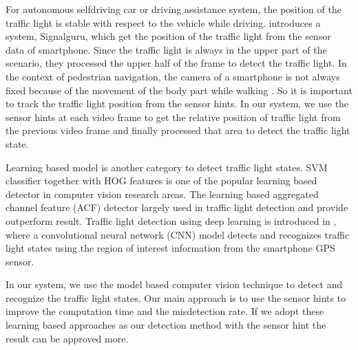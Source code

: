 For autonomous selfdriving car or driving assistance system, the position of the traffic light is stable with respect to the vehicle while driving.
\cite{signalguru} introduces a system, Signalguru, which get the position of the traffic light from the sensor data of smartphone.
Since the traffic light is always in the upper part of the scenario, they processed the upper half of the frame to detect the traffic light.
In the context of pedestrian navigation, the camera of a smartphone is not always fixed because of the movement of the body part while walking \cite{sensor_pedestrian,sensor_pedestrian2}.
So it is important to track the traffic light position from the sensor hints.
In our system, we use the sensor hints at each video frame to get the relative position of traffic light from the previous video frame and finally processed that area to detect the traffic light state.

Learning based model \cite{learning,learning2} is another category to detect traffic light states.
SVM classifier together with HOG features \cite{selfdrive} is one of the popular learning based detector in computer vision research areas.
The learning based aggregated channel feature (ACF) \cite{acf,acf2,lisa_cvpr} detector largely used in traffic light detection and provide outperform result.
Traffic light detection using deep learning is introduced in \cite{cnn,cnn2,cnn3}, where a convolutional neural network (CNN) model detects and recognizes traffic light states using the region of interest information from the smartphone GPS sensor.

In our system, we use the model based computer vision technique to detect and recognize the traffic light states.
Our main approach is to use the sensor hints to improve the computation time and the misdetection rate.
If we adopt these learning based approaches as our detection method with the sensor hint the result can be approved more.  






